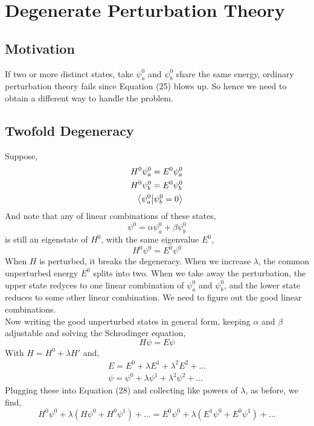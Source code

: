 \section{Degenerate Perturbation Theory}
\subsection{Motivation}
If two or more distinct states, take $\psi^0_a$ and $\psi^0_b$ share the same energy, ordinary perturbation theory fails since Equation (25) blows up. So hence we need to obtain a different way to handle the problem.

\subsection{Twofold Degeneracy}
Suppose,
\begin{align*}
H^0\psi^0_a=E^0\psi^0_a\\
H^0\psi^0_b=E^0\psi^0_b\\
\braket{\psi^0_a}{\psi^0_b=0}
\end{align*}
And note that any of linear combinations of these states,
\begin{equation}
\psi^0=\alpha\psi^0_a+\beta\psi^0_b
\end{equation}
is still an eigenstate of $H^0$, with the same eigenvalue $E^0$,
\begin{equation}
H^0\psi^0=E^0\psi^0
\end{equation}	 
When $H$ is perturbed, it breaks the degeneracy. When we increase $\lambda$, the common unperturbed energy $E^0$ splits into two. When we take away the perturbation, the upper state redyces to one linear combination of $\psi^0_a$ and $\psi^0_b$, and the lower state reduces to some other linear combination. We need to figure out the good linear combinations.\\
Now writing the good unperturbed states in general form, keeping $\alpha$ and $\beta$ adjustable and solving the Schrodinger equation,
\begin{equation}
H\psi=E\psi
\end{equation}
With $H=H^0+\lambda H'$ and,
\begin{align}
E=E^0+\lambda E^1 + \lambda^2 E^2 +...\\
\psi=\psi^0+\lambda\psi^1+\lambda^2\psi^2+...
\end{align} 
Plugging these into Equation (28) and collecting like powers of $\lambda$, as before, we find,
\begin{equation}
H^0\psi^0+\lambda(H\psi^0+H^0\psi^1)+...=E^0\psi^0+\lambda(E^1\psi^0+E^0\psi^1)+...
\end{equation}
